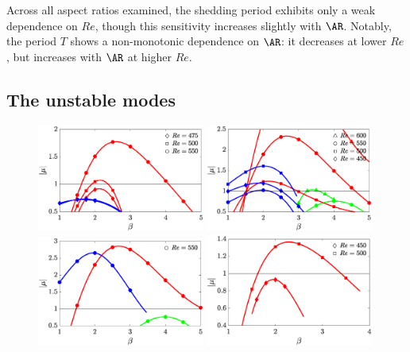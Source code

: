 Across all aspect ratios examined, the shedding period exhibits only a weak dependence on $Re$, though this sensitivity increases slightly with $\AR$. Notably, the period $T$ shows a non-monotonic dependence on $\AR$: it decreases at lower $Re$, but increases with $\AR$ at higher $Re$.

\subsection{The unstable modes}

\begin{figure}
  \centering
  \includegraphics[width=0.49\textwidth]{./fig/AR5s/multipliers_AR5p25.eps}  
  \includegraphics[width=0.49\textwidth]{./fig/AR5s/multipliers_AR5p5.eps}  
  \includegraphics[width=0.49\textwidth]{./fig/AR5s/multipliers_AR5p75.eps} 
  \includegraphics[width=0.49\textwidth]{./fig/AR7s/multipliers_AR6.eps}  

\end{figure}
